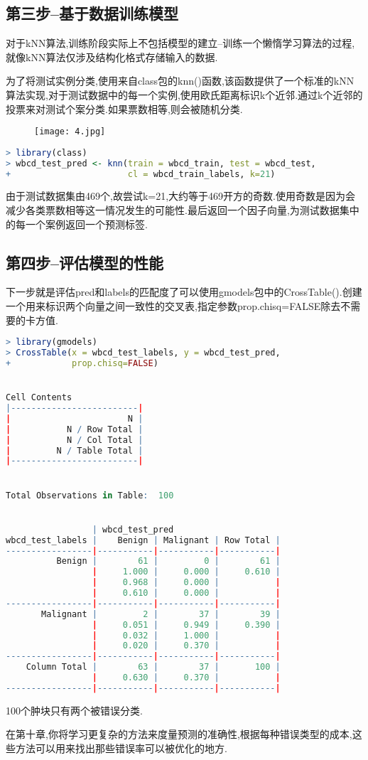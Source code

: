 \documentclass[11pt,a4paper,oneside]{book}
\begin{document}
\subsection{第三步--基于数据训练模型}
对于kNN算法,训练阶段实际上不包括模型的建立--训练一个懒惰学习算法的过程,就像kNN算法仅涉及结构化格式存储输入的数据.

为了将测试实例分类,使用来自class包的knn()函数,该函数提供了一个标准的kNN算法实现,对于测试数据中的每一个实例,使用欧氏距离标识k个近邻.通过k个近邻的投票来对测试个案分类.如果票数相等,则会被随机分类.
\begin{figure}[H]
	\centering
	\texttt{[image: 4.jpg]}  
\end{figure}
\begin{lstlisting}[language=r]
> library(class)
> wbcd_test_pred <- knn(train = wbcd_train, test = wbcd_test,
+                       cl = wbcd_train_labels, k=21)
\end{lstlisting}
由于测试数据集由469个,故尝试k=21,大约等于469开方的奇数.使用奇数是因为会减少各类票数相等这一情况发生的可能性.最后返回一个因子向量,为测试数据集中的每一个案例返回一个预测标签.
\subsection{第四步--评估模型的性能}
下一步就是评估pred和labels的匹配度了可以使用gmodels包中的CrossTable().创建一个用来标识两个向量之间一致性的交叉表,指定参数prop.chisq=FALSE除去不需要的卡方值.
\begin{lstlisting}[language=r]
> library(gmodels)
> CrossTable(x = wbcd_test_labels, y = wbcd_test_pred,
+            prop.chisq=FALSE)


Cell Contents
|-------------------------|
|                       N |
|           N / Row Total |
|           N / Col Total |
|         N / Table Total |
|-------------------------|


Total Observations in Table:  100 


                 | wbcd_test_pred 
wbcd_test_labels |    Benign | Malignant | Row Total | 
-----------------|-----------|-----------|-----------|
          Benign |        61 |         0 |        61 | 
                 |     1.000 |     0.000 |     0.610 | 
                 |     0.968 |     0.000 |           | 
                 |     0.610 |     0.000 |           | 
-----------------|-----------|-----------|-----------|
       Malignant |         2 |        37 |        39 | 
                 |     0.051 |     0.949 |     0.390 | 
                 |     0.032 |     1.000 |           | 
                 |     0.020 |     0.370 |           | 
-----------------|-----------|-----------|-----------|
    Column Total |        63 |        37 |       100 | 
                 |     0.630 |     0.370 |           | 
-----------------|-----------|-----------|-----------|
\end{lstlisting}
100个肿块只有两个被错误分类.
\begin{tcolorbox}[colback=pink!10!white,colframe=pink!100!black]
在第十章,你将学习更复杂的方法来度量预测的准确性,根据每种错误类型的成本,这些方法可以用来找出那些错误率可以被优化的地方.
\end{tcolorbox}
\end{document}
